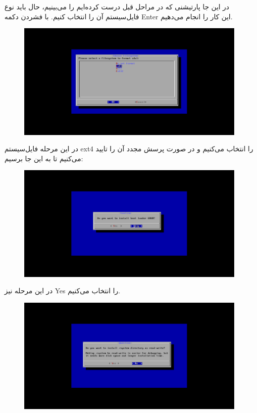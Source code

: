 \documentclass{article}
\begin{document}
در این جا پارتیشنی که در مراحل قبل درست‌ کرده‌ایم را می‌بینیم، حال باید نوع فایل‌سیستم آن را انتخاب کنیم. با فشردن دکمه Enter این کار را انجام می‌دهیم.

\begin{figure}[ht]
	\centering	
	\includegraphics[width = 1\textwidth]{images/install11.png}
\end{figure}

\newpage

در این مرحله فایل‌سیستم ext4 را انتخاب می‌کنیم و در صورت پرسش مجدد آن را تایید می‌کنیم تا به این جا برسیم:

\begin{figure}[ht]
	\centering	
	\includegraphics[width = 1\textwidth]{images/install12.png}
\end{figure}

در این مرحله نیز Yes را انتخاب می‌کنیم.

\newpage

\begin{figure}[ht]
	\centering	
	\includegraphics[width = 1\textwidth]{images/install13.png}
\end{figure}
\end{document}
